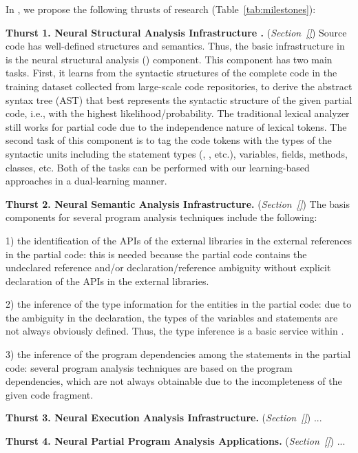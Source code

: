 In {\tool}, we propose the following thrusts of research
(Table~\ref{tab:milestones}):

\vspace{3pt}
\noindent \textbf{Thurst 1. Neural Structural Analysis Infrastructure
  .} ({\em Section~\ref{}}) Source code has
well-defined structures and semantics. Thus, the basic infrastructure
in {\tool} is the neural structural analysis ()
component.  This component has two main tasks. First, it learns from
the syntactic structures of the complete code in the training dataset
collected from large-scale code repositories, to derive the abstract
syntax tree (AST) that best represents the syntactic structure of the
given partial code, i.e., with the highest likelihood/probability.
The traditional lexical analyzer still works for partial code due to
the independence nature of lexical tokens. The second task of this
component is to tag the code tokens with the types of the syntactic
units including the statement types (, , etc.),
variables, fields, methods, classes, etc. Both of the tasks can be
performed with our learning-based approaches in a dual-learning
manner.
  
\vspace{3pt}
\noindent \textbf{Thurst 2. Neural Semantic Analysis Infrastructure.}
({\em Section~\ref{}}) The basis components for several program
analysis techniques include the following:

1) the identification of the APIs of the external libraries in the
external references in the partial code: this is needed because the
partial code contains the undeclared reference and/or
declaration/reference ambiguity without explicit declaration of the
APIs in the external libraries.

2) the inference of the type information for the entities in the
partial code: due to the ambiguity in the declaration, the types of
the variables and statements are not always obviously defined. Thus,
the type inference is a basic service within {\tool}.

3) the inference of the program dependencies among the statements in
the partial code: several program analysis techniques are based on the
program dependencies, which are not always obtainable due to the
incompleteness of the given code fragment.

\vspace{3pt}
\noindent \textbf{Thurst 3. Neural Execution Analysis Infrastructure.}
({\em Section~\ref{}}) ...

\vspace{3pt}
\noindent \textbf{Thurst 4. Neural Partial Program Analysis Applications.}
({\em Section~\ref{}}) ...





